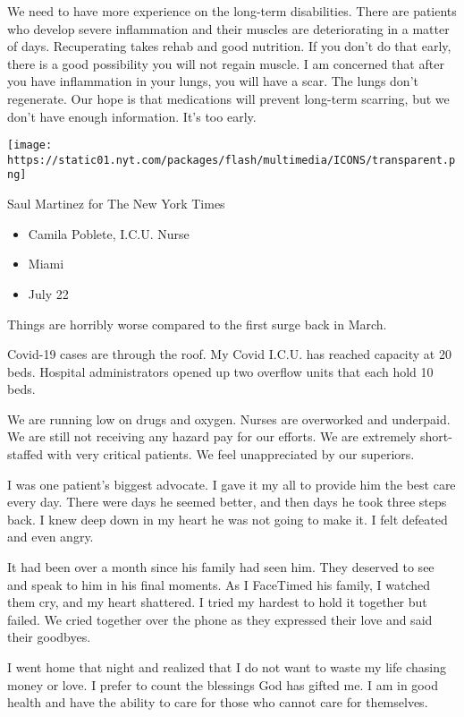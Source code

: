 We need to have more experience on the long-term disabilities. There are
patients who develop severe inflammation and their muscles are
deteriorating in a matter of days. Recuperating takes rehab and good
nutrition. If you don't do that early, there is a good possibility you
will not regain muscle. I am concerned that after you have inflammation
in your lungs, you will have a scar. The lungs don't regenerate. Our
hope is that medications will prevent long-term scarring, but we don't
have enough information. It's too early.

\texttt{[image: https://static01.nyt.com/packages/flash/multimedia/ICONS/transparent.png]}

Saul Martinez for The New York Times

\begin{itemize}
\tightlist
\item
  Camila Poblete, I.C.U. Nurse
\item
  Miami
\item
  July 22
\end{itemize}

Things are horribly worse compared to the first surge back in March.

Covid-19 cases are through the roof. My Covid I.C.U. has reached
capacity at 20 beds. Hospital administrators opened up two overflow
units that each hold 10 beds.

We are running low on drugs and oxygen. Nurses are overworked and
underpaid. We are still not receiving any hazard pay for our efforts. We
are extremely short-staffed with very critical patients. We feel
unappreciated by our superiors.

I was one patient's biggest advocate. I gave it my all to provide him
the best care every day. There were days he seemed better, and then days
he took three steps back. I knew deep down in my heart he was not going
to make it. I felt defeated and even angry.

It had been over a month since his family had seen him. They deserved to
see and speak to him in his final moments. As I FaceTimed his family, I
watched them cry, and my heart shattered. I tried my hardest to hold it
together but failed. We cried together over the phone as they expressed
their love and said their goodbyes.

I went home that night and realized that I do not want to waste my life
chasing money or love. I prefer to count the blessings God has gifted
me. I am in good health and have the ability to care for those who
cannot care for themselves.

